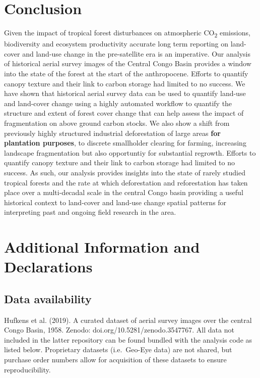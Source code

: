 \documentclass[remote sensing,article,submit,moreauthors,pdftex]{mdpi}
\begin{document}
\hypertarget{conclusion}{%
\section{Conclusion}\label{conclusion}}

Given the impact of tropical forest disturbances on atmospheric
CO\textsubscript{2} emissions, biodiversity and ecosystem productivity
accurate long term reporting on land-cover and land-use change in the
pre-satellite era is an imperative. Our analysis of historical aerial
survey images of the Central Congo Basin provides a window into the
state of the forest at the start of the anthropocene. Efforts to
quantify canopy texture and their link to carbon storage had limited to
no success. We have shown that historical aerial survey data can be used
to quantify land-use and land-cover change using a highly automated
workflow to quantify the structure and extent of forest cover change
that can help assess the impact of fragmentation on above ground carbon
stocks. We also show a shift from previously highly structured
industrial deforestation of large areas \textbf{for plantation
purposes}, to discrete smallholder clearing for farming, increasing
landscape fragmentation but also opportuntiy for substantial regrowth.
Efforts to quantify canopy texture and their link to carbon storage had
limited to no success. As such, our analysis provides insights into the
state of rarely studied tropical forests and the rate at which
deforestation and reforestation has taken place over a multi-decadal
scale in the central Congo basin providing a useful historical context
to land-cover and land-use change spatial patterns for interpreting past
and ongoing field research in the area.

\hypertarget{additional-information-and-declarations}{%
\section{Additional Information and
Declarations}\label{additional-information-and-declarations}}

\hypertarget{data-availability}{%
\subsection{Data availability}\label{data-availability}}

Hufkens et al. (2019). A curated dataset of aerial survey images over
the central Congo Basin, 1958. Zenodo: doi.org/10.5281/zenodo.3547767.
All data not included in the latter repository can be found bundled with
the analysis code as listed below. Proprietary datasets (i.e.~Geo-Eye
data) are not shared, but purchase order numbers allow for acquisition
of these datasets to ensure reproducibility.
\end{document}
